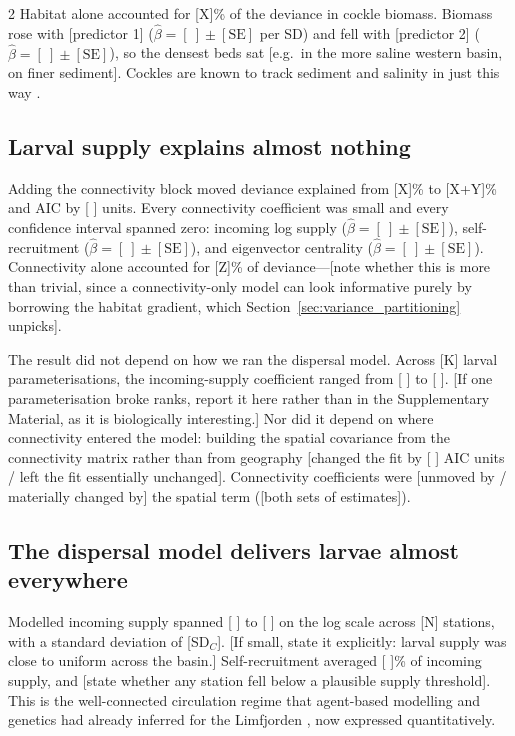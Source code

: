 \begin{spacing}{2}
Habitat alone accounted for [X]\% of the deviance in cockle biomass. Biomass rose with [predictor 1] ($\hat{\beta} = [\ ] \pm [\mathrm{SE}]$ per SD) and fell with [predictor 2] ($\hat{\beta} = [\ ] \pm [\mathrm{SE}]$), so the densest beds sat [e.g.\ in the more saline western basin, on finer sediment]. Cockles are known to track sediment and salinity in just this way \citep{Peteiro2018,Compton2013}.

\subsection{Larval supply explains almost nothing}

Adding the connectivity block moved deviance explained from [X]\% to [X+Y]\% and AIC by [ ] units. Every connectivity coefficient was small and every confidence interval spanned zero: incoming log supply ($\hat{\beta} = [\ ] \pm [\mathrm{SE}]$), self-recruitment ($\hat{\beta} = [\ ] \pm [\mathrm{SE}]$), and eigenvector centrality ($\hat{\beta} = [\ ] \pm [\mathrm{SE}]$). Connectivity alone accounted for [Z]\% of deviance---[note whether this is more than trivial, since a connectivity-only model can look informative purely by borrowing the habitat gradient, which Section~\ref{sec:variance_partitioning} unpicks].

The result did not depend on how we ran the dispersal model. Across [K] larval parameterisations, the incoming-supply coefficient ranged from [ ] to [ ]. [If one parameterisation broke ranks, report it here rather than in the Supplementary Material, as it is biologically interesting.] Nor did it depend on where connectivity entered the model: building the spatial covariance from the connectivity matrix rather than from geography [changed the fit by [ ] AIC units / left the fit essentially unchanged]. Connectivity coefficients were [unmoved by / materially changed by] the spatial term ([both sets of estimates]).

\subsection{The dispersal model delivers larvae almost everywhere}

Modelled incoming supply spanned [ ] to [ ] on the log scale across [N] stations, with a standard deviation of [SD$_C$]. [If small, state it explicitly: larval supply was close to uniform across the basin.] Self-recruitment averaged [ ]\% of incoming supply, and [state whether any station fell below a plausible supply threshold]. This is the well-connected circulation regime that agent-based modelling and genetics had already inferred for the Limfjorden \citep{Pastor2020,Pastor2023}, now expressed quantitatively.


\end{spacing}

